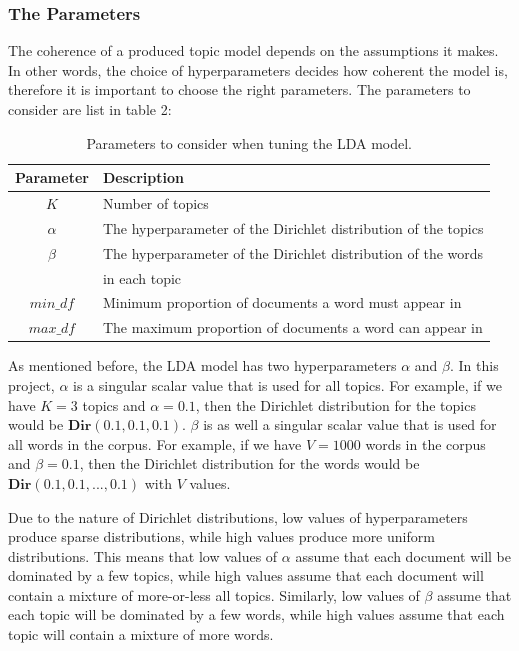 \subsubsection*{The Parameters}

The coherence of a produced topic model depends on the assumptions it makes. In other words, the choice of hyperparameters decides how coherent the model is, therefore it is important to choose the right parameters. The parameters to consider are list in table 2:

\begin{table}[h]
    \centering
    \begin{tabular}{cl}
        \hline
        Parameter & Description \\
        \hline
        $K$ & Number of topics \\
        $\alpha$ & The hyperparameter of the Dirichlet distribution of the topics\\
        $\beta$ & The hyperparameter of the Dirichlet distribution of the words  \\
          &  in each topic \\
        $min\_df$ & Minimum proportion of documents a word must appear in \\
        $max\_df$ & The maximum proportion of documents a word can appear in \\
\end{tabular}
    \caption{Parameters to consider when tuning the LDA model.}
    \label{tab:parameters}
\end{table}

As mentioned before, the LDA model has two hyperparameters $\alpha$ and $\beta$. In this project, $\alpha$ is a singular scalar value that is used for all topics. For example, if we have $K=3$ topics and $\alpha=0.1$, then the Dirichlet distribution for the topics would be $\textbf{Dir}(0.1, 0.1, 0.1)$. $\beta$ is as well a singular scalar value that is used for all words in the corpus. For example, if we have $V=1000$ words in the corpus and $\beta=0.1$, then the Dirichlet distribution for the words would be $\textbf{Dir}(0.1, 0.1, ..., 0.1)$ with $V$ values.

Due to the nature of Dirichlet distributions, low values of hyperparameters produce sparse distributions, while high values produce more uniform distributions. This means that low values of $\alpha$ assume that each document will be dominated by a few topics, while high values assume that each document will contain a mixture of more-or-less all topics. Similarly, low values of $\beta$ assume that each topic will be dominated by a few words, while high values assume that each topic will contain a mixture of more words.

